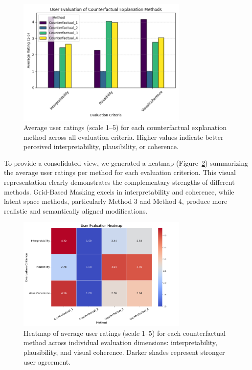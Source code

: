 \begin{figure}[htbp]
    \centering
    \includegraphics[width=0.75\textwidth]{img/human_rating_results/bar_plot_user_evaluations.png}
    \caption[Bar plot of average user ratings for CE methods]{%
Average user ratings (scale 1–5) for each counterfactual explanation method across all evaluation criteria. Higher values indicate better perceived interpretability, plausibility, or coherence.}
    \label{fig:bar_plot_user_eval}
\end{figure}


To provide a consolidated view, we generated a heatmap (Figure~\ref{fig:heatmap_user_eval}) summarizing the average user ratings per method for each evaluation criterion. This visual representation clearly demonstrates the complementary strengths of different methods. Grid-Based Masking excels in interpretability and coherence, while latent space methods, particularly Method 3 and Method 4, produce more realistic and semantically aligned modifications.

\begin{figure}[htbp]
    \centering
    \includegraphics[width=0.75\textwidth]{img/human_rating_results/heatmap_user_evaluations.png}
    \caption[Heatmap of user evaluations by method and criterion]{%
Heatmap of average user ratings (scale 1–5) for each counterfactual method across individual evaluation dimensions: interpretability, plausibility, and visual coherence. Darker shades represent stronger user agreement.}
    \label{fig:heatmap_user_eval}
\end{figure}


